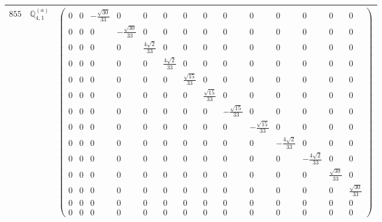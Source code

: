 \documentclass[fleqn,8pt,landscape]{jsarticle}
\begin{document}
\begin{center}
\begin{longtable}{ccc}
$ 855 $ & $ \mathbb{Q}_{4,1}^{(a)} $ & $ \begin{pmatrix} 0 & 0 & - \frac{\sqrt{30}}{33} & 0 & 0 & 0 & 0 & 0 & 0 & 0 & 0 & 0 & 0 & 0 \\ 0 & 0 & 0 & - \frac{\sqrt{30}}{33} & 0 & 0 & 0 & 0 & 0 & 0 & 0 & 0 & 0 & 0 \\ 0 & 0 & 0 & 0 & \frac{4 \sqrt{2}}{33} & 0 & 0 & 0 & 0 & 0 & 0 & 0 & 0 & 0 \\ 0 & 0 & 0 & 0 & 0 & \frac{4 \sqrt{2}}{33} & 0 & 0 & 0 & 0 & 0 & 0 & 0 & 0 \\ 0 & 0 & 0 & 0 & 0 & 0 & \frac{\sqrt{15}}{33} & 0 & 0 & 0 & 0 & 0 & 0 & 0 \\ 0 & 0 & 0 & 0 & 0 & 0 & 0 & \frac{\sqrt{15}}{33} & 0 & 0 & 0 & 0 & 0 & 0 \\ 0 & 0 & 0 & 0 & 0 & 0 & 0 & 0 & - \frac{\sqrt{15}}{33} & 0 & 0 & 0 & 0 & 0 \\ 0 & 0 & 0 & 0 & 0 & 0 & 0 & 0 & 0 & - \frac{\sqrt{15}}{33} & 0 & 0 & 0 & 0 \\ 0 & 0 & 0 & 0 & 0 & 0 & 0 & 0 & 0 & 0 & - \frac{4 \sqrt{2}}{33} & 0 & 0 & 0 \\ 0 & 0 & 0 & 0 & 0 & 0 & 0 & 0 & 0 & 0 & 0 & - \frac{4 \sqrt{2}}{33} & 0 & 0 \\ 0 & 0 & 0 & 0 & 0 & 0 & 0 & 0 & 0 & 0 & 0 & 0 & \frac{\sqrt{30}}{33} & 0 \\ 0 & 0 & 0 & 0 & 0 & 0 & 0 & 0 & 0 & 0 & 0 & 0 & 0 & \frac{\sqrt{30}}{33} \\ 0 & 0 & 0 & 0 & 0 & 0 & 0 & 0 & 0 & 0 & 0 & 0 & 0 & 0 \\ 0 & 0 & 0 & 0 & 0 & 0 & 0 & 0 & 0 & 0 & 0 & 0 & 0 & 0 \end{pmatrix} $ \\ \hline

\end{longtable}
\end{center}
\end{document}
